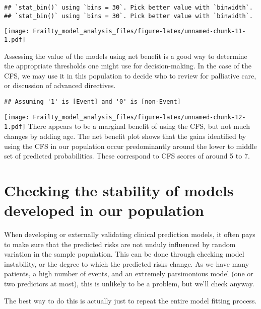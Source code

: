 \documentclass[
]{article}
\begin{document}
\begin{verbatim}
## `stat_bin()` using `bins = 30`. Pick better value with `binwidth`.
## `stat_bin()` using `bins = 30`. Pick better value with `binwidth`.
\end{verbatim}

\texttt{[image: Frailty\_model\_analysis\_files/figure-latex/unnamed-chunk-11-1.pdf]}

Assessing the value of the models using net benefit is a good way to
determine the appropriate thresholds one might use for decision-making.
In the case of the CFS, we may use it in this population to decide who
to review for palliative care, or discussion of advanced directives.

\begin{verbatim}
## Assuming '1' is [Event] and '0' is [non-Event]
\end{verbatim}

\texttt{[image: Frailty\_model\_analysis\_files/figure-latex/unnamed-chunk-12-1.pdf]}
There appears to be a marginal benefit of using the CFS, but not much
changes by adding age. The net benefit plot shows that the gains
identified by using the CFS in our population occur predominantly around
the lower to middle set of predicted probabilities. These correspond to
CFS scores of around 5 to 7.

\hypertarget{checking-the-stability-of-models-developed-in-our-population}{%
\section{Checking the stability of models developed in our
population}\label{checking-the-stability-of-models-developed-in-our-population}}

When developing or externally validating clinical prediction models, it
often pays to make sure that the predicted risks are not unduly
influenced by random variation in the sample population. This can be
done through checking model instability, or the degree to which the
predicted risks change. As we have many patients, a high number of
events, and an extremely parsimonious model (one or two predictors at
most), this is unlikely to be a problem, but we'll check anyway.

The best way to do this is actually just to repeat the entire model
fitting process.
\end{document}
